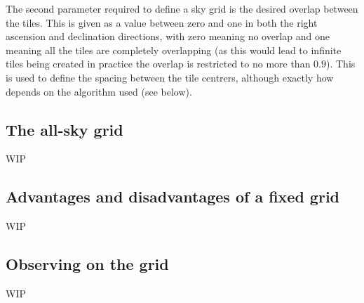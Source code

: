 \begin{colsection}
\begin{colsection}
The second parameter required to define a sky grid is the desired overlap between the tiles. This is given as a value between zero and one in both the right ascension and declination directions, with zero meaning no overlap and one meaning all the tiles are completely overlapping (as this would lead to infinite tiles being created in practice the overlap is restricted to no more than $0.9$). This is used to define the spacing between the tile centrers, although exactly how depends on the algorithm used (see below).

\end{colsection}


\subsection{The all-sky grid}
\label{sec:survey}
\begin{colsection}

WIP

\end{colsection}


\subsection{Advantages and disadvantages of a fixed grid}
\label{sec:fixed_grid}
\begin{colsection}

WIP

\end{colsection}


\subsection{Observing on the grid}
\label{sec:grid_observing}
\begin{colsection}

WIP

\end{colsection}


\end{colsection}


\newpage
